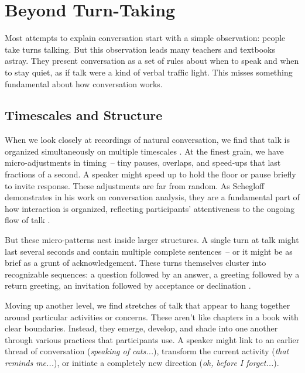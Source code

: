 \section{Beyond Turn-Taking} \label{sec:beyond-turns}

Most attempts to explain conversation start with a simple observation: people take turns talking. But this observation leads many teachers and textbooks astray. They present conversation as a set of rules about when to speak and when to stay quiet, as if talk were a kind of verbal traffic light. This misses something fundamental about how conversation works.

\subsection{Timescales and Structure} \label{subsec:timescales}

When we look closely at recordings of natural conversation, we find that talk is organized simultaneously on multiple timescales \citep{Schegloff1977,Fauviaux2023}. At the finest grain, we have micro-adjustments in timing~-- tiny pauses, overlaps, and speed-ups that last fractions of a second. A speaker might speed up to hold the floor or pause briefly to invite response. These adjustments are far from random. As Schegloff demonstrates in his work on conversation analysis, they are a fundamental part of how interaction is organized, reflecting participants' attentiveness to the ongoing flow of talk \citep{Schegloff1982}.

But these micro-patterns nest inside larger structures. A single turn at talk might last several seconds and contain multiple complete sentences~-- or it might be as brief as a grunt of acknowledgement. These turns themselves cluster into recognizable sequences: a question followed by an answer, a greeting followed by a return greeting, an invitation followed by acceptance or declination \citep{Sacks1973}.

Moving up another level, we find stretches of talk that appear to hang together around particular activities or concerns. These aren't like chapters in a book with clear boundaries. Instead, they emerge, develop, and shade into one another through various practices that participants use. A speaker might link to an earlier thread of conversation (\textit{speaking of cats...}), transform the current activity (\textit{that reminds me...}), or initiate a completely new direction (\textit{oh, before I forget...}).

